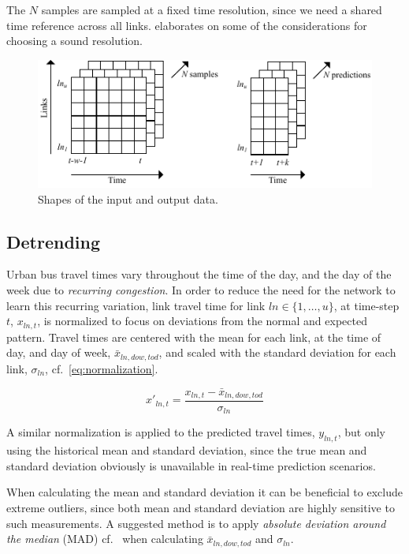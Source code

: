 \documentclass[preprint,11pt,5p,twocolumn]{elsarticle}
\begin{document}
The $N$ samples are sampled at a fixed time resolution, since we need a shared time reference across all links.  elaborates on some of the considerations for choosing a sound resolution.

\begin{figure}[!ht]
  \centering
  \includegraphics[scale=1.0]{drawings/data_shape.pdf}
  \caption{Shapes of the input and output data.}
  \label{fig:data_shape}
\end{figure}

\subsection{Detrending}
Urban bus travel times vary throughout the time of the day, and the day of the week due to \emph{recurring congestion}. In order to reduce the need for the network to learn this recurring variation, link travel time for link $\mathit{ln} \in \{ 1,\ldots,u\}$, at time-step $t$, $x_{\mathit{ln},t}$, is normalized to focus on deviations from the normal and expected pattern. Travel times are centered with the mean for each link, at the time of day, and day of week, $\mathit{\bar{x}_{\mathit{ln},\mathit{dow},\mathit{tod}}}$, and scaled with the standard deviation for each link, $\sigma_\mathit{ln}$, cf.~\cref{eq:normalization}.

\begin{equation}
  x'_{\mathit{ln},t} = \frac{x_{\mathit{ln},t} - \bar{x}_{\mathit{ln},\mathit{dow},\mathit{tod}}}{\sigma_\mathit{ln}}
  \label{eq:normalization}
\end{equation}

A similar normalization is applied to the predicted travel times, $y_{\mathit{ln},t}$, but only using the historical mean and standard deviation, since the true mean and standard deviation obviously is unavailable in real-time prediction scenarios.

When calculating the mean and standard deviation it can be beneficial to exclude extreme outliers, since both mean and standard deviation are highly sensitive to such measurements. A suggested method is to apply \emph{absolute deviation around the median} (MAD) cf.~\cite{Olewuezi2011} when calculating $\mathit{\bar{x}_{\mathit{ln},\mathit{dow},\mathit{tod}}}$ and $\sigma_\mathit{ln}$.
\end{document}
